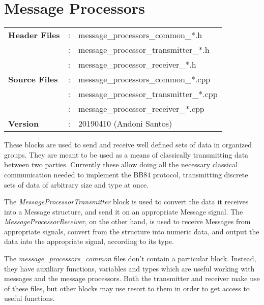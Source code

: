 \clearpage
\graphicspath{{./lib/message_processors/figures/}}
\section{Message Processors}

\begin{tcolorbox}	
	\begin{tabular}{p{2.75cm} p{0.2cm} p{10.5cm}} 	
        \textbf{Header Files}    &:& message\_processors\_common\_*.h \\
                                &:& message\_processor\_transmitter\_*.h \\
                                &:& message\_processor\_receiver\_*.h \\
		\textbf{Source Files}    &:& message\_processors\_common\_*.cpp \\
                                &:& message\_processor\_transmitter\_*.cpp \\
                                &:& message\_processor\_receiver\_*.cpp \\
        \textbf{Version}        &:& 20190410 (Andoni Santos)
	\end{tabular}
\end{tcolorbox}

\maketitle
These blocks are used to send and receive well defined sets of data in organized
groups. They are meant to be used as a means of classically transmitting data
between two parties. Currently these allow doing all the necessary classical
communication needed to implement the BB84 protocol, transmitting discrete sets
of data of arbitrary size and type at once.

The \textit{MessageProcessorTransmitter} block is used to convert the data it
receives into a Message structure, and send it on an appropriate Message signal.
The \textit{MessageProcessorReceiver}, on the other hand, is used to receive
Messages from appropriate signals, convert from the structure into numeric data,
and output the data into the appropriate signal, according to its type.

The \textit{message\_processors\_common} files don't contain a particular block.
Instead, they have auxiliary functions, variables and types which are useful
working with messages and the message processors. Both the transmitter and
receiver make use of these files, but other blocks may use resort to them in
order to get access to useful functions.

